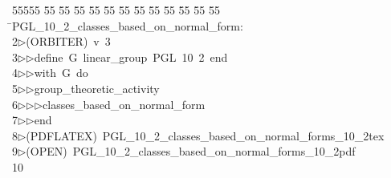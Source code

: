 %
%
\begin{tabbing}
55555 \= 55 \= 55 \= 55 \= 55 \= 55 \= 55 \= 55 \= 55 \= 55 \= 55 \= 55 \= 55 \= \>PGL\_10\_2\_classes\_based\_on\_normal\_form:\\[0pt]
2\>$\triangleright$\>(ORBITER)\ v\ 3\ \\[0pt]
3\>$\triangleright$\>$\triangleright$\>define\ G\ linear\_group\ PGL\ 10\ 2\ end\ \\[0pt]
4\>$\triangleright$\>$\triangleright$\>with\ G\ do\ \\[0pt]
5\>$\triangleright$\>$\triangleright$\>group\_theoretic\_activity\ \\[0pt]
6\>$\triangleright$\>$\triangleright$\>$\triangleright$\>classes\_based\_on\_normal\_form\ \\[0pt]
7\>$\triangleright$\>$\triangleright$\>end\\[0pt]
8\>$\triangleright$\>(PDFLATEX)\ PGL\_10\_2\_classes\_based\_on\_normal\_forms\_10\_2tex\\[0pt]
9\>$\triangleright$\>(OPEN)\ PGL\_10\_2\_classes\_based\_on\_normal\_forms\_10\_2pdf\\[0pt]
10\>\end{tabbing}
